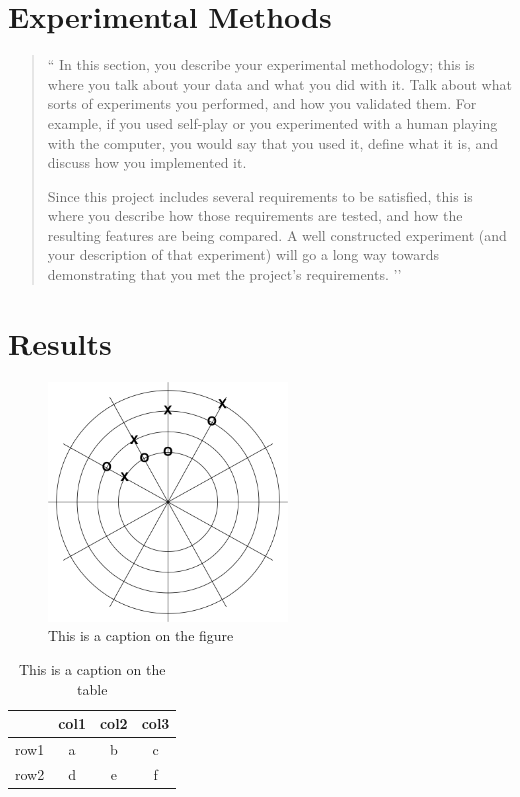 \documentclass[12pt,letterpaper]{article}
\begin{document}
\section{Experimental Methods}
\begin{quote}
`` 
In this section, you describe your experimental methodology; this is where you talk
about your data and what you did with it.  Talk about what sorts of experiments
you performed, and how you validated them.  For example, if you used self-play
or you experimented with a human playing with the computer, you would say that 
you used it, define what it is, and discuss how you implemented it.  

Since this project includes several requirements to be satisfied, this is where you describe
how those requirements are tested, and how the resulting features are being compared.
A well constructed experiment (and your description of that experiment) will go a long
way towards demonstrating that you met the project's requirements.
’’
\end{quote}

\section{Results}
\begin{figure}
\begin{center}
\includegraphics[width=2.5in]{P-TTT-ex.png}
\end{center}
\caption{This is a caption on the figure}
\label{somefigure}
\end{figure}

\begin{table}
\begin{center}
\begin{tabular}{|c||c|c|c|}
\hline
& col1 & col2 & col3\\
\hline \hline
row1 & a & b & c\\
\hline 
row2 & d & e & f\\
\hline 
\end{tabular}
\end{center}
\caption{This is a caption on the table}
\label{sometable}
\end{table}
\end{document}
